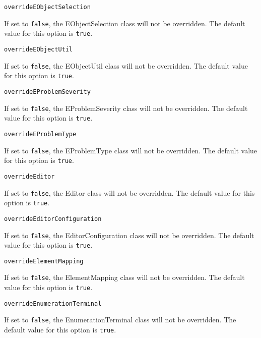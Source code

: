 \noindent\texttt{overrideEObjectSelection}
\begin{myindentpar}{1cm}
If set to \texttt{false}, the EObjectSelection class will not be overridden. The default value for this option is \texttt{true}.
\end{myindentpar}

\noindent\texttt{overrideEObjectUtil}
\begin{myindentpar}{1cm}
If set to \texttt{false}, the EObjectUtil class will not be overridden. The default value for this option is \texttt{true}.
\end{myindentpar}

\noindent\texttt{overrideEProblemSeverity}
\begin{myindentpar}{1cm}
If set to \texttt{false}, the EProblemSeverity class will not be overridden. The default value for this option is \texttt{true}.
\end{myindentpar}

\noindent\texttt{overrideEProblemType}
\begin{myindentpar}{1cm}
If set to \texttt{false}, the EProblemType class will not be overridden. The default value for this option is \texttt{true}.
\end{myindentpar}

\noindent\texttt{overrideEditor}
\begin{myindentpar}{1cm}
If set to \texttt{false}, the Editor class will not be overridden. The default value for this option is \texttt{true}.
\end{myindentpar}

\noindent\texttt{overrideEditorConfiguration}
\begin{myindentpar}{1cm}
If set to \texttt{false}, the EditorConfiguration class will not be overridden. The default value for this option is \texttt{true}.
\end{myindentpar}

\noindent\texttt{overrideElementMapping}
\begin{myindentpar}{1cm}
If set to \texttt{false}, the ElementMapping class will not be overridden. The default value for this option is \texttt{true}.
\end{myindentpar}

\noindent\texttt{overrideEnumerationTerminal}
\begin{myindentpar}{1cm}
If set to \texttt{false}, the EnumerationTerminal class will not be overridden. The default value for this option is \texttt{true}.
\end{myindentpar}

